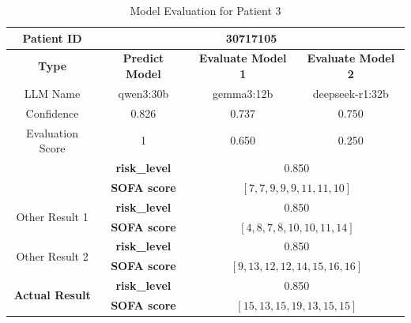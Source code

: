 \begin{table}[htbp]
 \centering
 \caption{Model Evaluation for Patient 3}
 \label{tab:patient3}
 \begin{tabular}{cccc}
 \toprule
 \textbf{ Patient ID } & \multicolumn{3}{c}{30717105} \\
 \midrule
 \textbf{ Type } & \textbf{ Predict Model } & \textbf{ Evaluate Model 1 } & \textbf{ Evaluate Model 2 } \\
 LLM Name & qwen3:30b & gemma3:12b & deepseek-r1:32b \\
 Confidence & 0.826 & 0.737 & 0.750 \\
 Evaluation Score & 1 & 0.650 & 0.250 \\
 \midrule
 \addlinespace
 \multirow{2}{*}{\textbf{ Best Result }} & \textbf{ risk\_level } & \multicolumn{2}{c}{0.850} \\
      & \textbf{ SOFA score } & \multicolumn{2}{c}{$[7, 7, 9, 9, 9, 11, 11, 10]$} \\
 \midrule
 \multirow{2}{*}{Other Result 1} & \textbf{ risk\_level } & \multicolumn{2}{c}{0.850} \\
      & \textbf{ SOFA score } & \multicolumn{2}{c}{$[4, 8, 7, 8, 10, 10, 11, 14]$} \\
 \midrule
 \multirow{2}{*}{Other Result 2} & \textbf{ risk\_level } & \multicolumn{2}{c}{0.850} \\
      & \textbf{ SOFA score } & \multicolumn{2}{c}{$[9, 13, 12, 12, 14, 15, 16, 16]$} \\
 \midrule
 \multirow{2}{*}{\textbf{ Actual Result }} & \textbf{ risk\_level } & \multicolumn{2}{c}{0.850} \\
      & \textbf{ SOFA score } & \multicolumn{2}{c}{$[15, 13, 15, 19, 13, 15, 15]$} \\
 \bottomrule
 \end{tabular}
\end{table}

